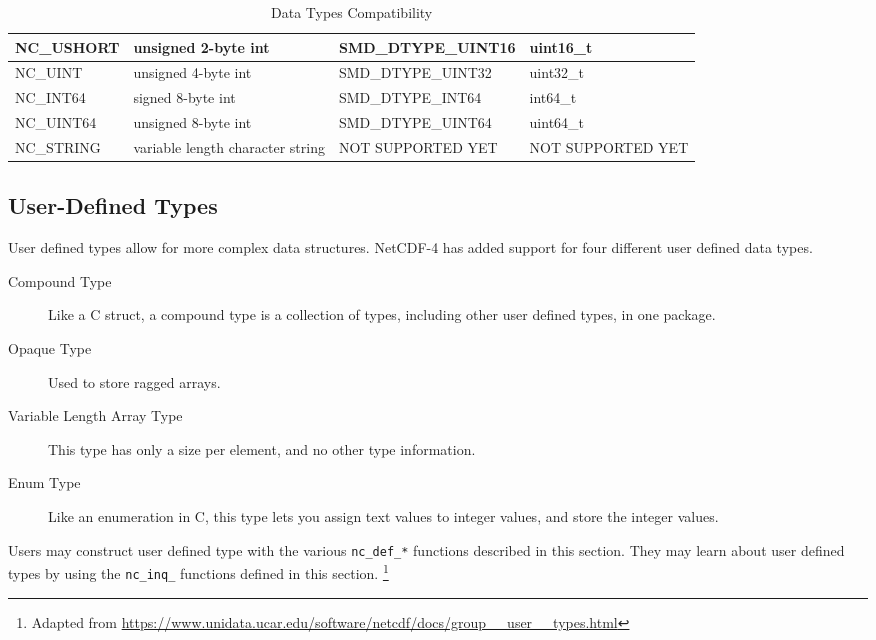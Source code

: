 \begin{table}[H]
\begin{tabular}{|l|m{4.7cm}|l|l|}
\scriptsize{NC\_USHORT} & \small{unsigned 2-byte int} &    \scriptsize{SMD\_DTYPE\_UINT16}        & \small{uint16\_t}    \\ \hline
\scriptsize{NC\_UINT} & \small{unsigned 4-byte int} &   \scriptsize{SMD\_DTYPE\_UINT32}          & \small{uint32\_t}    \\ \hline
\scriptsize{NC\_INT64} & \small{signed 8-byte int} &    \scriptsize{SMD\_DTYPE\_INT64}         & \small{int64\_t}    \\ \hline
\scriptsize{NC\_UINT64} & \small{unsigned 8-byte int} &    \scriptsize{SMD\_DTYPE\_UINT64}        & \small{uint64\_t}    \\ \hline
\scriptsize{NC\_STRING} & \small{variable length character string} & \scriptsize{NOT SUPPORTED YET} & \scriptsize{NOT SUPPORTED YET} \\ \hline
\end{tabular}
\caption{\label{datatypes-netcdf} Data Types Compatibility}
\end{table}

\subsection{User-Defined Types}
\label{ud-type}

{\itshape

User defined types allow for more complex data structures. NetCDF-4 has added support for four different user defined data types.

\begin{description}

\item[Compound Type]

Like a C struct, a compound type is a collection of types, including other user defined types, in one package.

\item[Opaque Type]

Used to store ragged arrays.

\item[Variable Length Array Type]

This type has only a size per element, and no other type information.

\item[Enum Type]

Like an enumeration in C, this type lets you assign text values to integer values, and store the integer values.

\end{description}

Users may construct user defined type with the various \texttt{nc\_def\_*} functions described in this section. They may learn about user defined types by using the \texttt{nc\_inq\_} functions defined in this section.
\footnote{Adapted from \url{https://www.unidata.ucar.edu/software/netcdf/docs/group__user__types.html}}

}

